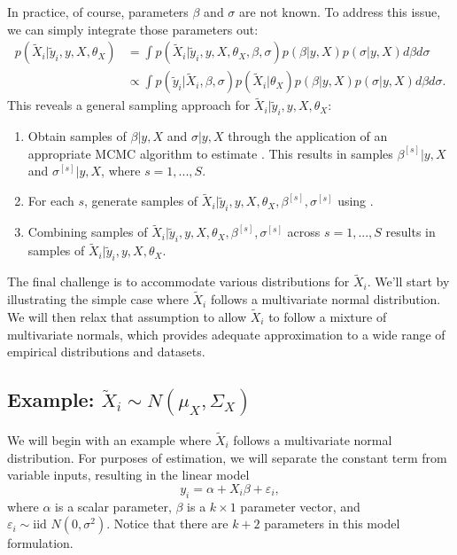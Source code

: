 \documentclass{article}
\newcommand{\ep}{\varepsilon}
\newcommand{\s}{^{[s]}}
\newcommand{\ty}{\tilde{y}_i}
\newcommand{\tX}{\tilde{X}_i}
\begin{document}
In practice, of course, parameters $\beta$ and $\sigma$ are not known. To address this issue, we can simply integrate those parameters out:
\begin{align}
	p(\tX | \ty, y, X, \theta_X) &= \int p(\tX | \ty, y, X, \theta_X, \beta, \sigma) p(\beta | y, X) p(\sigma | y, X) d\beta d\sigma \\
	&\propto \int p(\ty | \tX, \beta, \sigma) p(\tX | \theta_X) p(\beta | y, X) p(\sigma | y, X) d\beta d\sigma.
\end{align}
This reveals a general sampling approach for $\tX | \ty, y, X, \theta_X$:
\begin{enumerate}
	\item Obtain samples of $\beta | y, X$ and $\sigma | y, X$ through the application of an appropriate MCMC algorithm to estimate . This results in samples $\beta\s | y, X$ and $\sigma\s | y, X$, where $s = 1, ..., S$.
	\item For each $s$, generate samples of $\tX | \ty, y, X, \theta_X, \beta\s, \sigma\s$ using .
	\item Combining samples of $\tX | \ty, y, X, \theta_X, \beta\s, \sigma\s$ across $s = 1, ..., S$ results in samples of $\tX | \ty, y, X, \theta_X$.
\end{enumerate}

The final challenge is to accommodate various distributions for $\tX$. We'll start by illustrating the simple case where $\tX$ follows a multivariate normal distribution. We will then relax that assumption to allow $\tX$ to follow a mixture of multivariate normals, which provides adequate approximation to a wide range of empirical distributions and datasets.

\subsection*{Example: $\tX\sim N(\mu_X, \Sigma_X)$}

We will begin with an example where $\tX$ follows a multivariate normal distribution. For purposes of estimation, we will separate the constant term from variable inputs, resulting in the linear model
\begin{equation}
	y_i = \alpha + X_i \beta + \ep_i,
\end{equation}
where $\alpha$ is a scalar parameter, $\beta$ is a $k\times 1$ parameter vector, and $\ep_i \sim \mbox{iid }N(0, \sigma^2)$. Notice that there are $k+2$ parameters in this model formulation.
\end{document}
